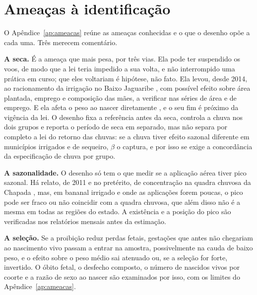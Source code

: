 
\chapter{Ameaças à identificação}
\label{cap:ameacas}

O Apêndice~\ref{ap:ameacas} reúne as ameaças conhecidas e o que o desenho
opõe a cada uma. Três merecem comentário.

\textbf{A seca.} É a ameaça que mais pesa, por três vias. Ela pode ter
suspendido os voos, de modo que a lei teria impedido a sua volta, e não
interrompido uma prática em curso; que eles voltariam é hipótese, não fato.
Ela levou, desde 2014, ao racionamento da irrigação no Baixo Jaguaribe
\cite{pereira2015conflitos}, com possível efeito sobre área plantada, emprego
e composição das mães, a verificar nas séries de área e de emprego. E ela
afeta o peso ao nascer diretamente \cite{rocha2015water}, e o seu fim é
próximo da vigência da lei. O desenho fixa a referência antes da seca,
controla a chuva nos dois grupos e reporta o período de seca em separado, mas
não separa por completo a lei do retorno das chuvas: se a chuva tiver efeito
sazonal diferente em municípios irrigados e de sequeiro, $\beta$ o captura, e
por isso se exige a concordância da especificação de chuva por grupo.

\textbf{A sazonalidade.} O desenho só tem o que medir se a aplicação aérea
tiver pico sazonal. Há relato, de 2011 e no pretérito, de concentração na
quadra chuvosa da Chapada \cite[p.~152]{carneiro2015dossie}, mas, em bananal irrigado e onde as aplicações forem poucas, o
pico pode ser fraco ou não coincidir com a quadra chuvosa, que além disso não
é a mesma em todas as regiões do estado. A existência e a posição do pico são
verificadas nos relatórios mensais antes da estimação.

\textbf{A seleção.} Se a proibição reduz perdas fetais, gestações que antes
não chegariam ao nascimento vivo passam a entrar na amostra, possivelmente na
cauda de baixo peso, e o efeito sobre o peso médio sai atenuado ou, se a seleção for forte,
invertido. O óbito fetal, o desfecho composto, o número de nascidos vivos por coorte e a razão de sexo ao
nascer são examinados por isso, com os limites do Apêndice~\ref{ap:ameacas}.
